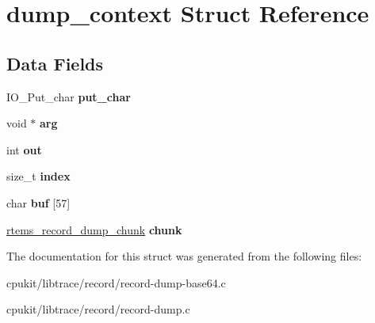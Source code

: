 \hypertarget{structdump__context}{}\section{dump\+\_\+context Struct Reference}
\label{structdump__context}
\subsection*{Data Fields}
\begin{DoxyCompactItemize}
\item 
\mbox{\label{structdump__context_af19835b1e1e2285b9962ce124fc2d246}} 
I\+O\+\_\+\+Put\+\_\+char {\bfseries put\+\_\+char}
\item 
\mbox{\label{structdump__context_a0d91bca0539f7064ed5048d0f8f4f222}} 
void $\ast$ {\bfseries arg}
\item 
\mbox{\label{structdump__context_af4beb987ef52222723a5291b12ee882a}} 
int {\bfseries out}
\item 
\mbox{\label{structdump__context_a2cc89e5dcb4c67d44cc4e64348e06931}} 
size\+\_\+t {\bfseries index}
\item 
\mbox{\label{structdump__context_a5fddfcfbc019b74fc61ac981f0d54cd8}} 
char {\bfseries buf} \mbox{[}57\mbox{]}
\item 
\mbox{\label{structdump__context_a176fb1388b198e905c9fe312409ab2d9}} 
\mbox{\hyperlink{group__RTEMSRecord_gad5d67c09a47fe0f93067be3667db7ce0}{rtems\+\_\+record\+\_\+dump\+\_\+chunk}} {\bfseries chunk}
\end{DoxyCompactItemize}


The documentation for this struct was generated from the following files\+:\begin{DoxyCompactItemize}
\item 
cpukit/libtrace/record/record-\/dump-\/base64.\+c\item 
cpukit/libtrace/record/record-\/dump.\+c\end{DoxyCompactItemize}
